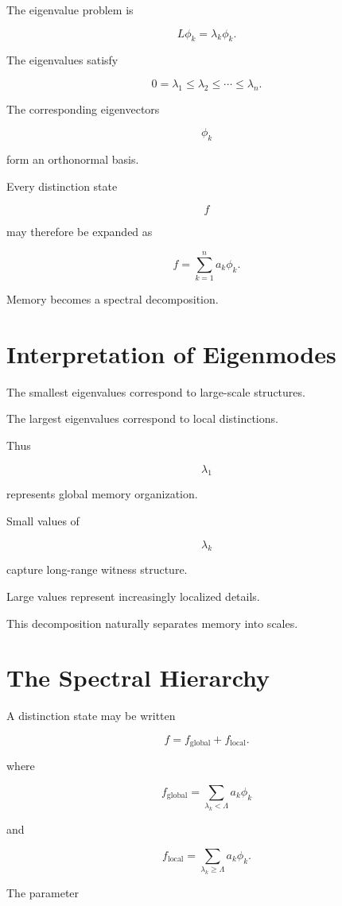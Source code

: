 \documentclass[12pt,oneside]{book}
\theoremstyle{plain} \newtheorem{theorem}{Theorem}[chapter] \newtheorem{lemma}[theorem]{Lemma} \newtheorem{proposition}[theorem]{Proposition} \newtheorem{corollary}[theorem]{Corollary}
\theoremstyle{definition} \newtheorem{definition}[theorem]{Definition} \newtheorem{axiom}[theorem]{Axiom} \newtheorem{construction}[theorem]{Construction}
\theoremstyle{remark} \newtheorem{remark}[theorem]{Remark} \newtheorem{example}[theorem]{Example}
\begin{document}
The eigenvalue problem is

\[
L\phi_k
=
\lambda_k\phi_k.
\]

The eigenvalues satisfy

\[
0
=
\lambda_1
\le
\lambda_2
\le
\cdots
\le
\lambda_n.
\]

The corresponding eigenvectors

\[
\phi_k
\]

form an orthonormal basis.

Every distinction state

\[
f
\]

may therefore be expanded as

\[
f
=
\sum_{k=1}^{n}
a_k\phi_k.
\]

Memory becomes a spectral decomposition.

\section{Interpretation of Eigenmodes}

The smallest eigenvalues correspond to large-scale structures.

The largest eigenvalues correspond to local distinctions.

Thus

\[
\lambda_1
\]

represents global memory organization.

Small values of

\[
\lambda_k
\]

capture long-range witness structure.

Large values represent increasingly localized details.

This decomposition naturally separates memory into scales.

\section{The Spectral Hierarchy}

A distinction state may be written

\[
f
=
f_{\mathrm{global}}
+
f_{\mathrm{local}}.
\]

where

\[
f_{\mathrm{global}}
=
\sum_{\lambda_k<\Lambda}
a_k\phi_k
\]

and

\[
f_{\mathrm{local}}
=
\sum_{\lambda_k\ge \Lambda}
a_k\phi_k.
\]

The parameter
\end{document}
